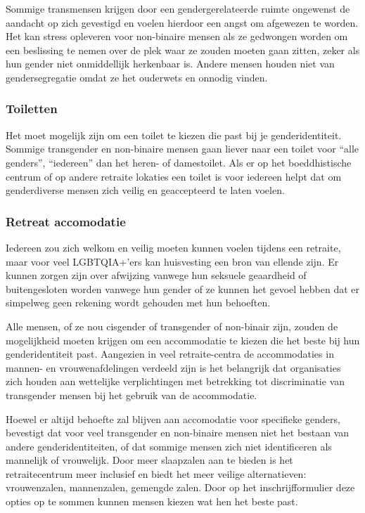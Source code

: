 \documentclass[12pt,openany]{book}
\begin{document}
Sommige transmensen krijgen door een gendergerelateerde ruimte ongewenst de aandacht op zich gevestigd en voelen hierdoor een angst om afgewezen te worden. Het kan stress opleveren voor non-binaire mensen als ze gedwongen worden om een beslissing te nemen over de plek waar ze zouden moeten gaan zitten, zeker als hun gender niet onmiddellijk herkenbaar is. Andere mensen houden niet van gendersegregatie omdat ze het ouderwets en onnodig vinden.

\subsubsection*{Toiletten}

Het moet mogelijk zijn om een toilet te kiezen die past bij je genderidentiteit. Sommige transgender en non-binaire mensen gaan liever naar een toilet voor “alle genders”, “iedereen” dan het heren- of damestoilet. Als er op het boeddhistische centrum of op andere retraite lokaties een toilet is voor iedereen helpt dat om genderdiverse mensen zich veilig en geaccepteerd te laten voelen.

\subsubsection*{Retreat accomodatie}

Iedereen zou zich welkom en veilig moeten kunnen voelen tijdens een retraite, maar voor veel LGBTQIA+’ers kan huisvesting een bron van ellende zijn. Er kunnen zorgen zijn over afwijzing vanwege hun seksuele geaardheid of buitengesloten worden vanwege hun gender of ze kunnen het gevoel hebben dat er simpelweg geen rekening wordt gehouden met hun behoeften. 

Alle mensen, of ze nou cisgender of transgender of non-binair zijn, zouden de mogelijkheid moeten krijgen om een accommodatie te kiezen die het beste bij hun genderidentiteit past.  Aangezien in veel retraite-centra de accommodaties in mannen- en vrouwenafdelingen verdeeld zijn is het belangrijk dat organisaties zich houden aan wettelijke verplichtingen met betrekking tot discriminatie van transgender mensen bij het gebruik van de accommodatie.

Hoewel er altijd behoefte zal blijven aan accomodatie voor specifieke genders, bevestigt dat voor veel transgender en non-binaire mensen niet het bestaan van andere genderidentiteiten, of dat sommige mensen zich niet identificeren als mannelijk of vrouwelijk. Door meer slaapzalen aan te bieden is het retraitecentrum meer inclusief en biedt het meer veilige alternatieven: vrouwenzalen, mannenzalen, gemengde zalen. Door op het inschrijfformulier deze opties op te sommen kunnen mensen kiezen wat hen het beste past.
\end{document}
